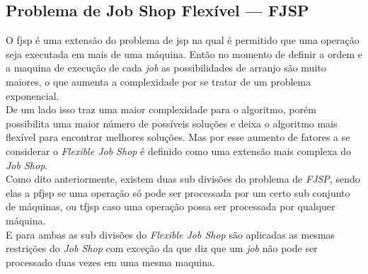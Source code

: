 \subsection{Problema de Job Shop Flexível — FJSP}
O \gls{fjsp} é uma extensão do problema de \gls{jsp} na qual é permitido que uma operação seja executada em mais de uma máquina. Então no momento de definir a ordem e a maquina de execução de cada \textit{job} as possibilidades de arranjo são muito maiores, o que aumenta a complexidade por se tratar de um problema exponencial.\\
\indent De um lado isso traz uma maior complexidade para o algoritmo, porém possibilita uma maior número de possíveis soluções e deixa o algoritmo mais flexível para encontrar melhores soluções. Mas por esse aumento de fatores a se considerar o \textit{Flexible Job Shop} é definido como uma extensão mais complexa do \textit{Job Shop}.\\
\indent Como dito anteriormente, existem duas sub divisões do problema de \textit{FJSP}, sendo elas a \gls{pfjsp} se uma operação só pode ser processada por um certo sub conjunto de máquinas, ou \gls{tfjsp} caso uma operação possa ser processada por qualquer máquina.\\
\indent E para ambas as sub divisões do \textit{Flexible Job Shop} são aplicadas as mesmas restrições do \textit{Job Shop} com exceção da que diz que um \textit{job} não pode ser processado duas vezes em uma mesma maquina.\hfill

